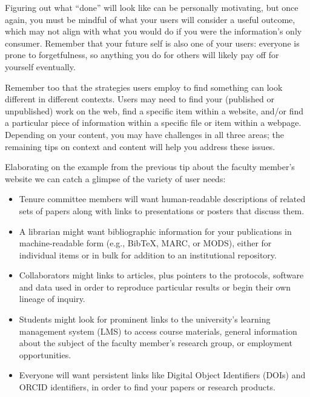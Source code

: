 \documentclass[10pt,letterpaper]{article}
\begin{document}
Figuring out what ``done'' will look like can be personally motivating, but once
again, you must be mindful of what your users will consider a useful outcome, which
may not align with what you would do if you were the information's only consumer.
Remember that your future self is also one of your users: everyone is prone to 
forgetfulness, so anything you do for others will likely pay off for yourself
eventually\cite{Briney2015}.

Remember too that the strategies users employ to find something can look different 
in different contexts. Users may need to find your (published or unpublished)
work on the web, find a specific item within a website, and/or find a particular 
piece of information within a specific file or item within a webpage. Depending on 
your content, you may have challenges in all three areas; the remaining tips on 
context and content will help you address these issues.

Elaborating on the example from the previous tip about the faculty member's website 
we can catch a glimpse of the variety of user needs:

\begin{itemize}

\item
  Tenure committee members will want human-readable descriptions of related sets
  of papers along with links to presentations or posters that discuss them.
 
\item
  A librarian might want bibliographic information for your publications in
  machine-readable form (e.g., BibTeX, MARC, or MODS), either for individual
  items or in bulk for addition to an institutional repository.

\item
  Collaborators might links to articles, plus pointers to the protocols, 
  software and data used in order to reproduce particular results or begin
  their own lineage of inquiry.

\item
  Students might look for prominent links to the university's learning management
  system (LMS) to access course materials, general information about the subject 
  of the faculty member's research group, or employment opportunities. 
  
  \item
  Everyone will want persistent links like Digital Object Identifiers (DOIs) \cite{DOI2020} 
  and ORCID \cite{ORCID2020} identifiers, in order to find your papers or research products.

\end{itemize}
\end{document}
